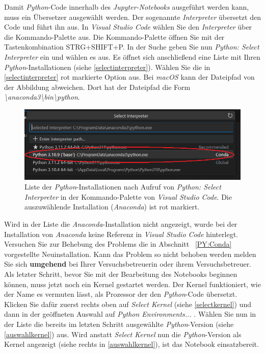\documentclass[12pt]{scrbook}
\begin{document}
Damit \textit{Python}-Code innerhalb des \textit{Jupyter-Notebooks} ausgeführt werden kann, muss ein Übersetzer ausgewählt werden. Der sogenannte \textit{Interpreter} übersetzt den Code und führt ihn aus. In \textit{Visual Studio Code} wählen Sie den \textit{Interpreter} über die Kommando-Palette aus. Die Kommando-Palette öffnen Sie mit der Tastenkombination STRG+SHIFT+P. In der Suche geben Sie nun \textit{Python: Select Interpreter} ein und wählen es aus. Es öffnet sich anschließend eine Liste mit Ihren \textit{Python}-Installationen (siehe \autoref{selectinterpreter}). Wählen Sie die in \autoref{selectinterpreter} rot markierte Option aus. Bei \textit{macOS} kann der Dateipfad von der Abbildung abweichen. Dort hat der Dateipfad die Form \textit{\textbackslash anaconda3\textbackslash bin\textbackslash python}.

\begin{figure}[ht]
\center
\includegraphics[scale=0.7]{Select Interpreter.png}
\caption{Liste der \textit{Python}-Installationen nach Aufruf von \textit{Python: Select Interpreter} in der Kommando-Palette von \textit{Visual Studio Code}. Die auszuwählende Installation (\textit{Anaconda}) ist rot markiert.}
\label{selectinterpreter}
\end{figure}

Wird in der Liste die \textit{Anaconda}-Installation nicht angezeigt, wurde bei der Installation von \textit{Anaconda} keine Referenz in \textit{Visual Studio Code} hinterlegt. Versuchen Sie zur Behebung des Problems die in Abschnitt ~\ref{PY:Conda} vorgestellte Neuinstallation. Kann das Problem so nicht behoben werden melden Sie sich \textbf{umgehend} bei Ihrer Versuchsbetreuerin oder ihrem Versuchsbetreuer.\\
\newline
Als letzter Schritt, bevor Sie mit der Bearbeitung des Notebooks beginnen können, muss jetzt noch ein Kernel gestartet werden. Der Kernel funktioniert, wie der Name es vermuten lässt, als Prozessor der den \textit{Python}-Code übersetzt. Klicken Sie dafür zuerst rechts oben auf \textit{Select Kernel} (siehe \autoref{selectkernel}) und dann in der geöffneten Auswahl auf \textit{Python Environments...} . Wählen Sie nun in der Liste die bereits im letzten Schritt ausgewählte \textit{Python}-Version (siehe \autoref{auswahlkernel}) aus. Wird anstatt \textit{Select Kernel} nun die \textit{Python}-Version als Kernel angezeigt (siehe rechts in \autoref{auswahlkernel}), ist das Notebook einsatzbereit.\newline 
\end{document}
